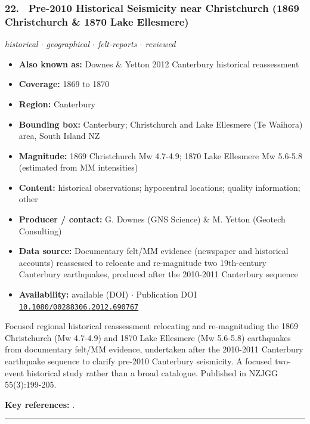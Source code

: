 \documentclass[10pt,a4paper]{article}
\newcommand{\catentryrule}{\par\vspace{3pt}\noindent\textcolor{rulegrey}{\rule{\linewidth}{0.3pt}}\par\vspace{5pt}}
\newcommand{\kv}[2]{\item \textbf{#1:} #2}
\begin{document}
\subsubsection*{\hypertarget{c:22}{22.}~ Pre-2010 Historical Seismicity near Christchurch (1869 Christchurch \& 1870 Lake Ellesmere)}
{\small\itshape historical $\cdot$ geographical $\cdot$ felt-reports $\cdot$ reviewed}\par\vspace{2pt}
\begin{itemize}[leftmargin=1.3em,itemsep=0.6pt,topsep=1pt,parsep=0pt]
\kv{Also known as}{Downes \& Yetton 2012 Canterbury historical reassessment}
\kv{Coverage}{1869 to 1870}
\kv{Region}{Canterbury}
\kv{Bounding box}{Canterbury; Christchurch and Lake Ellesmere (Te Waihora) area, South Island NZ}
\kv{Magnitude}{1869 Christchurch Mw 4.7-4.9; 1870 Lake Ellesmere Mw 5.6-5.8 (estimated from MM intensities)}
\kv{Content}{historical observations; hypocentral locations; quality information; other}
\kv{Producer / contact}{G. Downes (GNS Science) \& M. Yetton (Geotech Consulting)}
\kv{Data source}{Documentary felt/MM evidence (newspaper and historical accounts) reassessed to relocate and re-magnitude two 19th-century Canterbury earthquakes, produced after the 2010-2011 Canterbury sequence}
\kv{Availability}{available (DOI) $\cdot$ Publication DOI \href{https://doi.org/10.1080/00288306.2012.690767}{\nolinkurl{10.1080/00288306.2012.690767}}}
\end{itemize}
\par\vspace{2pt}Focused regional historical reassessment relocating and re-magnituding the 1869 Christchurch (Mw 4.7-4.9) and 1870 Lake Ellesmere (Mw 5.6-5.8) earthquakes from documentary felt/MM evidence, undertaken after the 2010-2011 Canterbury earthquake sequence to clarify pre-2010 Canterbury seismicity. A focused two-event historical study rather than a broad catalogue. Published in NZJGG 55(3):199-205.
\par\vspace{2pt}\textbf{Key references:} \cite{Downes2012}.
\catentryrule
\end{document}
